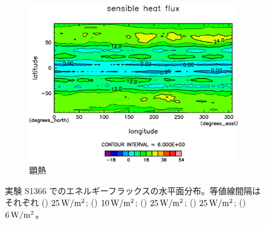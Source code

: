 \documentclass[body]{subfiles}
\begin{document}
\begin{figure}[t]
\begin{subfigure}{.4\textwidth}
		\includegraphics[width=\textwidth]{S1366/Sens,time=14600:14965-crop-rotate.pdf}
		\caption{顕熱\hmu*{[W/m^{-2}]}}\label{S1366顕熱}
	\end{subfigure}
	\caption[実験 S1366 のエネルギーフラックスの水平分布]{
		実験 S1366 でのエネルギーフラックスの水平面分布。等値線間隔はそれぞれ
		() \(25\hmu{W/m^2}\);
		() \(10\hmu{W/m^2}\);
		() \(25\hmu{W/m^2}\);
		() \(25\hmu{W/m^2}\);
		() \(6\hmu{W/m^2}\)。
	}\label{S1366_heat}
\end{figure}
\end{document}
